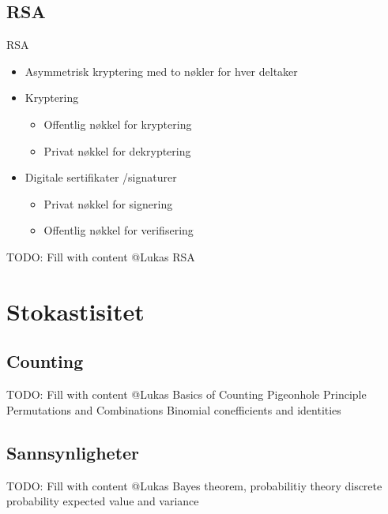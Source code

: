 \subsection*{RSA}
\begin{frame}{RSA}
\begin{itemize}
\item Asymmetrisk kryptering med to nøkler for hver deltaker
\item Kryptering
	\begin{itemize}
	\item Offentlig nøkkel for kryptering
	\item Privat nøkkel for dekryptering
	\end{itemize}
\item Digitale sertifikater /signaturer
	\begin{itemize}
	\item Privat nøkkel for signering
	\item Offentlig nøkkel for verifisering
	\end{itemize}
\end{itemize}
\end{frame}


\begin{frame}
TODO: Fill with content @Lukas 
RSA
\end{frame}

\section{Stokastisitet}
\subsection{Counting}
\begin{frame}
TODO: Fill with content @Lukas 
Basics of Counting
Pigeonhole Principle
Permutations and Combinations
Binomial conefficients and identities
\end{frame}

\subsection{Sannsynligheter}
\begin{frame}
TODO: Fill with content @Lukas 
Bayes theorem, probabilitiy theory
discrete probability
expected value and variance
\end{frame}


